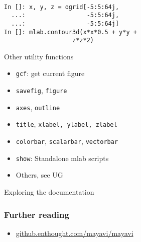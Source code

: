 \documentclass[14pt,compress]{beamer}
\newcommand{\myemph}[1]{\structure{\emph{#1}}}
\newcommand{\PythonCode}[1]{\lstinline{#1}}
\newcounter{time}
\newcommand{\inctime}[1]{\addtocounter{time}{#1}{\tiny \thetime\ m}}
\begin{document}
\begin{frame}

        \myemph{\Large 3D data}
    \vspace*{0.25in}

    \\

\begin{lstlisting}
In []: x, y, z = ogrid[-5:5:64j,
  ...:                 -5:5:64j,
  ...:                 -5:5:64j]
In []: mlab.contour3d(x*x*0.5 + y*y +
                   z*z*2)
\end{lstlisting}
\end{frame}

\begin{frame}[plain]
    {Other utility functions}
    \begin{itemize}
        \item \PythonCode{gcf}: get current figure
            \pause
        \item \PythonCode{savefig}, \PythonCode{figure}
           \pause
        \item \PythonCode{axes}, \PythonCode{outline}
            \pause
        \item \PythonCode{title}, \PythonCode{xlabel, ylabel, zlabel}
            \pause
        \item \PythonCode{colorbar}, \PythonCode{scalarbar},
            \PythonCode{vectorbar}
            \pause
        \item \PythonCode{show}: Standalone mlab scripts
            \pause
        \item Others, see UG
    \end{itemize}
\end{frame}

\begin{frame}
    {Exploring the documentation}
    \begin{center}
    \end{center}
    \inctime{20}
\end{frame}



\begin{frame}
    \frametitle{Further reading}
    \begin{itemize}
        \item \url{github.enthought.com/mayavi/mayavi}
    \end{itemize}
\end{frame}
\end{document}
